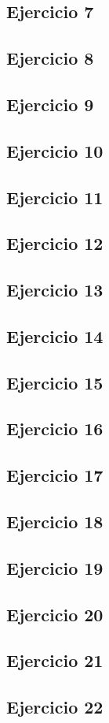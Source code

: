 \documentclass[10pt,a4paper]{article}
\begin{document}
  \subsection{Ejercicio 7}
  \subsection{Ejercicio 8}
  \subsection{Ejercicio 9}
  \subsection{Ejercicio 10}
  \subsection{Ejercicio 11}
  \subsection{Ejercicio 12}
  \subsection{Ejercicio 13}
  \subsection{Ejercicio 14}
  \subsection{Ejercicio 15}
  \subsection{Ejercicio 16}
  \subsection{Ejercicio 17}
  \subsection{Ejercicio 18}
  \subsection{Ejercicio 19}
  \subsection{Ejercicio 20}
  \subsection{Ejercicio 21}
  \subsection{Ejercicio 22}
\end{document}
